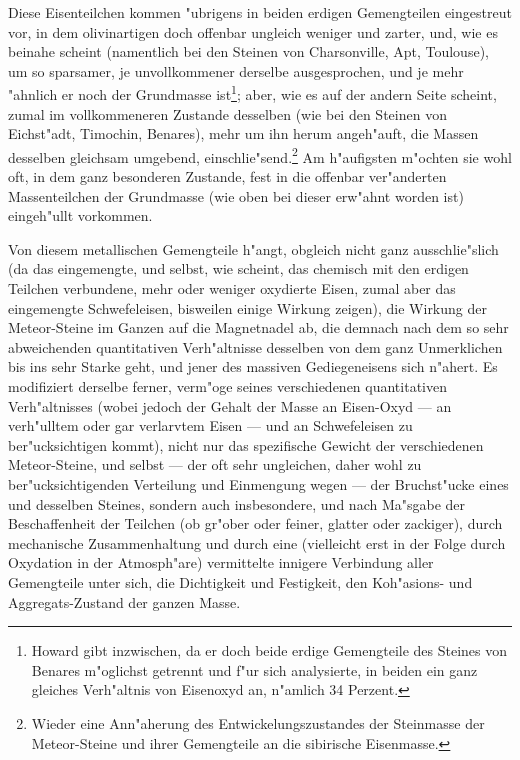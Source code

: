 \documentclass[a4paper, 11pt, oneside, german]{article}
\begin{document}
Diese Eisenteilchen kommen "ubrigens in beiden erdigen Gemengteilen eingestreut vor, in dem olivinartigen doch offenbar ungleich weniger und zarter, und, wie es beinahe scheint (namentlich bei den Steinen von Charsonville, Apt, Toulouse), um so sparsamer, je unvollkommener derselbe ausgesprochen, und je mehr "ahnlich er noch der Grundmasse ist\footnote{Howard gibt inzwischen, da er doch beide erdige Gemengteile des Steines von Benares m"oglichst getrennt und f"ur sich analysierte, in beiden ein ganz gleiches Verh"altnis von Eisenoxyd an, n"amlich 34 Perzent.}; aber, wie es auf der andern Seite scheint, zumal im vollkommeneren Zustande desselben (wie bei den Steinen von Eichst"adt, Timochin, Benares), mehr um ihn herum angeh"auft, die Massen desselben gleichsam umgebend, einschlie"send.\footnote{Wieder eine Ann"aherung des Entwickelungszustandes der Steinmasse der Meteor-Steine und ihrer Gemengteile an die sibirische Eisenmasse.} Am h"aufigsten m"ochten sie wohl oft, in dem ganz besonderen Zustande, fest in die offenbar ver"anderten Massenteilchen der Grundmasse (wie oben bei dieser erw"ahnt worden ist) eingeh"ullt vorkommen.

Von diesem metallischen Gemengteile h"angt, obgleich nicht ganz ausschlie"slich (da das eingemengte, und selbst, wie scheint, das chemisch mit den erdigen Teilchen verbundene, mehr oder weniger oxydierte Eisen, zumal aber das eingemengte Schwefeleisen, bisweilen einige Wirkung zeigen), die Wirkung der Meteor-Steine im Ganzen auf die Magnetnadel ab, die demnach nach dem so sehr abweichenden quantitativen Verh"altnisse desselben von dem ganz Unmerklichen bis ins sehr Starke geht, und jener des massiven Gediegeneisens sich n"ahert. Es modifiziert derselbe ferner, verm"oge seines verschiedenen quantitativen Verh"altnisses (wobei jedoch der Gehalt der Masse an Eisen-Oxyd --- an verh"ulltem oder gar verlarvtem Eisen --- und an Schwefeleisen zu ber"ucksichtigen kommt), nicht nur das spezifische Gewicht der verschiedenen Meteor-Steine, und selbst --- der oft sehr ungleichen, daher wohl zu ber"ucksichtigenden Verteilung und Einmengung wegen --- der Bruchst"ucke eines und desselben Steines, sondern auch insbesondere, und nach Ma"sgabe der Beschaffenheit der Teilchen (ob gr"ober oder feiner, glatter oder zackiger), durch mechanische Zusammenhaltung und durch eine (vielleicht erst in der Folge durch Oxydation in der Atmosph"are) vermittelte innigere Verbindung aller Gemengteile unter sich, die Dichtigkeit und Festigkeit, den Koh"asions- und Aggregats-Zustand der ganzen Masse.
\end{document}
